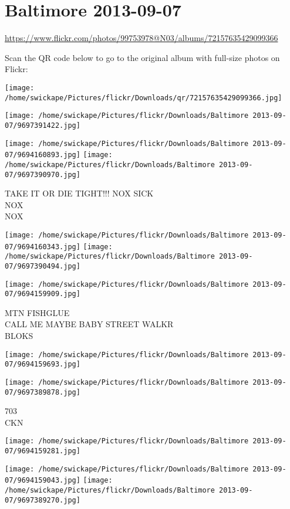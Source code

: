\documentclass[10pt,letterpaper]{article}
\title{}
\author{}
\date{}
\begin{document}
\section*{Baltimore 2013-09-07}

\url{https://www.flickr.com/photos/99753978@N03/albums/72157635429099366}

Scan the QR code below to go to the original album with full-size photos on Flickr:

\texttt{[image: /home/swickape/Pictures/flickr/Downloads/qr/72157635429099366.jpg]}
\pagebreak

\texttt{[image: /home/swickape/Pictures/flickr/Downloads/Baltimore 2013-09-07/9697391422.jpg]}

\vspace{0.25in}
\texttt{[image: /home/swickape/Pictures/flickr/Downloads/Baltimore 2013-09-07/9694160893.jpg]}
\texttt{[image: /home/swickape/Pictures/flickr/Downloads/Baltimore 2013-09-07/9697390970.jpg]}

TAKE IT OR DIE TIGHT!!! NOX SICK\\
NOX\\
NOX
\pagebreak

\texttt{[image: /home/swickape/Pictures/flickr/Downloads/Baltimore 2013-09-07/9694160343.jpg]}
\texttt{[image: /home/swickape/Pictures/flickr/Downloads/Baltimore 2013-09-07/9697390494.jpg]}

\vspace{0.25in}
\texttt{[image: /home/swickape/Pictures/flickr/Downloads/Baltimore 2013-09-07/9694159909.jpg]}

MTN FISHGLUE\\
CALL ME MAYBE BABY STREET WALKR\\
BLOKS
\pagebreak

\texttt{[image: /home/swickape/Pictures/flickr/Downloads/Baltimore 2013-09-07/9694159693.jpg]}

\vspace{0.25in}
\texttt{[image: /home/swickape/Pictures/flickr/Downloads/Baltimore 2013-09-07/9697389878.jpg]}

703\\
CKN
\pagebreak

\texttt{[image: /home/swickape/Pictures/flickr/Downloads/Baltimore 2013-09-07/9694159281.jpg]}

\vspace{0.25in}
\texttt{[image: /home/swickape/Pictures/flickr/Downloads/Baltimore 2013-09-07/9694159043.jpg]}
\texttt{[image: /home/swickape/Pictures/flickr/Downloads/Baltimore 2013-09-07/9697389270.jpg]}
\end{document}
